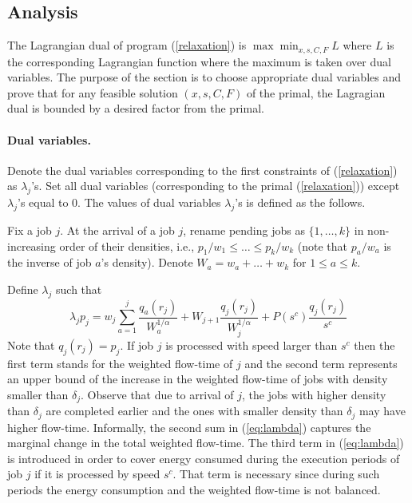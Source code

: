 \documentclass[11pt]{article}
\begin{document}
\subsection{Analysis} 
  
The Lagrangian dual of program (\ref{relaxation}) is $\max \min_{x,s,C,F} L$ 
where $L$ is the corresponding Lagrangian function where the maximum is taken over 
dual variables. The purpose of the section is to choose appropriate dual variables
and prove that for any feasible solution $(x,s,C,F)$ of the primal, the Lagragian dual
is bounded by a desired factor from the primal. 


\paragraph{Dual variables.} 
Denote the dual variables corresponding to the first constraints of (\ref{relaxation}) 
as $\lambda_{j}$'s. Set all dual variables (corresponding to the primal (\ref{relaxation})) 
except $\lambda_{j}$'s equal to 0.
The values of dual variables $\lambda_{j}$'s is defined as the follows. 

Fix a job $j$. At the arrival of a job $j$, 
rename pending jobs as $\{1,\ldots,k\}$
in non-increasing order of their  densities, i.e., 
$p_{1}/w_{1} \leq \ldots \leq p_{k}/w_{k}$ 
(note that $p_{a}/w_{a}$ is the inverse of job $a$'s density).
Denote $W_{a} = w_{a} + \ldots + w_{k}$ for $1 \leq a \leq k$.

Define $\lambda_{j}$ such that 
\begin{equation}		\label{eq:lambda}
\lambda_{j}p_{j} = w_{j} \sum_{a = 1}^{j} \frac{q_{a}(r_{j})}{W_{a}^{1/\alpha}}	
		+ W_{j+1} \frac{q_{j}(r_{j})}{W_{j}^{1/\alpha}} + P(s^{c}) \frac{q_{j}(r_{j})}{s^{c}}
\end{equation}
Note that $q_{j}(r_{j}) = p_{j}$.
If job $j$ is processed with speed larger than $s^{c}$ then
the first term stands for the weighted flow-time of $j$ and
the second term represents an upper bound of the increase 
in the weighted flow-time of jobs with density smaller than $\delta_{j}$. 
Observe that due to arrival of $j$, the jobs with higher density than $\delta_{j}$
are completed earlier and the ones with smaller density than $\delta_{j}$
may have higher flow-time. 
Informally, the second sum in (\ref{eq:lambda}) captures 
the marginal change in the total weighted flow-time. 
The third term in (\ref{eq:lambda}) is introduced in order to cover energy consumed during the 
execution periods of job $j$ if it is processed by speed $s^{c}$. That term is necessary 
since during such periods the 
energy consumption and the weighted flow-time is not balanced. 
\end{document}
